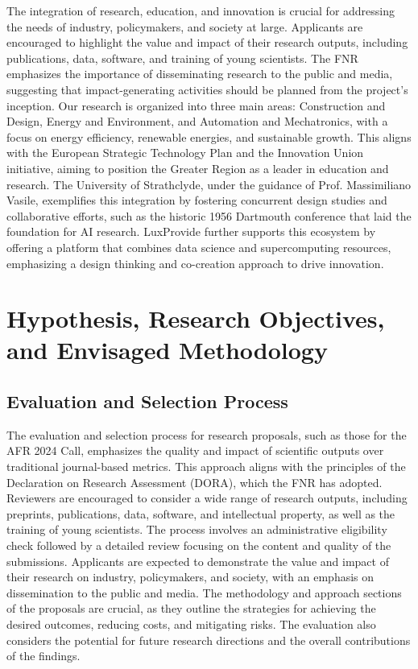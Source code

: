 \documentclass[12pt]{article}
\begin{document}
The integration of research, education, and innovation is crucial for addressing the needs of industry, policymakers, and society at large. Applicants are encouraged to highlight the value and impact of their research outputs, including publications, data, software, and training of young scientists. The FNR emphasizes the importance of disseminating research to the public and media, suggesting that impact-generating activities should be planned from the project's inception. Our research is organized into three main areas: Construction and Design, Energy and Environment, and Automation and Mechatronics, with a focus on energy efficiency, renewable energies, and sustainable growth. This aligns with the European Strategic Technology Plan and the Innovation Union initiative, aiming to position the Greater Region as a leader in education and research. The University of Strathclyde, under the guidance of Prof. Massimiliano Vasile, exemplifies this integration by fostering concurrent design studies and collaborative efforts, such as the historic 1956 Dartmouth conference that laid the foundation for AI research. LuxProvide further supports this ecosystem by offering a platform that combines data science and supercomputing resources, emphasizing a design thinking and co-creation approach to drive innovation.

\section{Hypothesis, Research Objectives, and Envisaged Methodology}

\subsection{Evaluation and Selection Process}

The evaluation and selection process for research proposals, such as those for the AFR 2024 Call, emphasizes the quality and impact of scientific outputs over traditional journal-based metrics. This approach aligns with the principles of the Declaration on Research Assessment (DORA), which the FNR has adopted. Reviewers are encouraged to consider a wide range of research outputs, including preprints, publications, data, software, and intellectual property, as well as the training of young scientists. The process involves an administrative eligibility check followed by a detailed review focusing on the content and quality of the submissions. Applicants are expected to demonstrate the value and impact of their research on industry, policymakers, and society, with an emphasis on dissemination to the public and media. The methodology and approach sections of the proposals are crucial, as they outline the strategies for achieving the desired outcomes, reducing costs, and mitigating risks. The evaluation also considers the potential for future research directions and the overall contributions of the findings.
\end{document}
